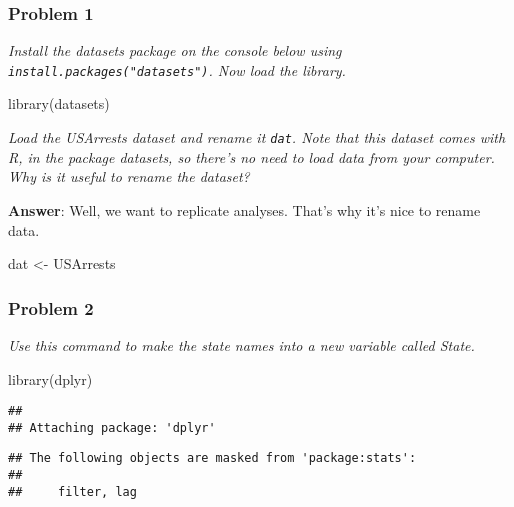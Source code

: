 \documentclass[
]{article}
\newenvironment{Shaded}{\begin{snugshade}}{\end{snugshade}}
\newcommand{\FunctionTok}[1]{\textcolor[rgb]{0.00,0.00,0.00}{#1}}
\newcommand{\NormalTok}[1]{#1}
\newcommand{\OtherTok}[1]{\textcolor[rgb]{0.56,0.35,0.01}{#1}}
\begin{document}
\hypertarget{problem-1}{%
\subsubsection{Problem 1}\label{problem-1}}

\emph{Install the datasets package on the console below using
\texttt{install.packages("datasets")}. Now load the library.}

\begin{Shaded}
\begin{Highlighting}[]
\FunctionTok{library}\NormalTok{(datasets)}
\end{Highlighting}
\end{Shaded}

\emph{Load the USArrests dataset and rename it \texttt{dat}. Note that
this dataset comes with R, in the package datasets, so there's no need
to load data from your computer. Why is it useful to rename the
dataset?}

\textbf{Answer}: Well, we want to replicate analyses. That's why it's
nice to rename data.

\begin{Shaded}
\begin{Highlighting}[]
\NormalTok{dat }\OtherTok{\textless{}{-}}\NormalTok{ USArrests}
\end{Highlighting}
\end{Shaded}

\hypertarget{problem-2}{%
\subsubsection{Problem 2}\label{problem-2}}

\emph{Use this command to make the state names into a new variable
called State. }

\begin{Shaded}
\begin{Highlighting}[]
\FunctionTok{library}\NormalTok{(dplyr)}
\end{Highlighting}
\end{Shaded}

\begin{verbatim}
## 
## Attaching package: 'dplyr'
\end{verbatim}

\begin{verbatim}
## The following objects are masked from 'package:stats':
## 
##     filter, lag
\end{verbatim}
\end{document}
